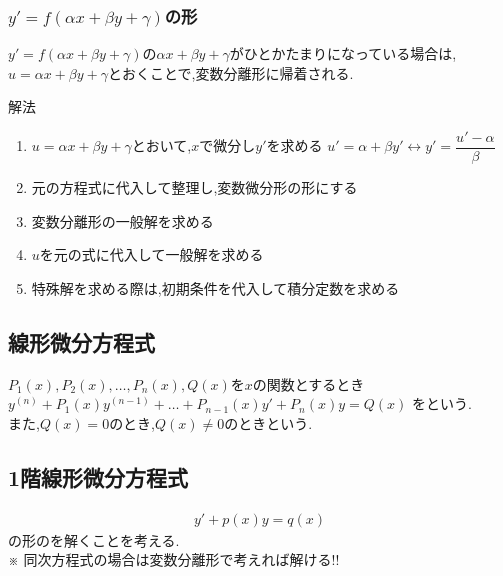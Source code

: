 \documentclass[a4paper]{jsarticle}
\begin{document}
\subsubsection{$y'=f\left(\alpha x+\beta y+\gamma\right)$の形}
$y'=f\left(\alpha x+\beta y+\gamma\right)$の$\alpha x+\beta y+\gamma$がひとかたまりになっている場合は,
$u=\alpha x+\beta y+\gamma$とおくことで,変数分離形に帰着される.
\begin{itembox}[l]{解法}
    \begin{enumerate}[(1)]
        \item $u=\alpha x+\beta y+\gamma$とおいて,$x$で微分し$y'$を求める
              \quad$u'=\alpha+\beta y'\leftrightarrow y'=\dfrac{u'-\alpha}{\beta}$
        \item 元の方程式に代入して整理し,変数微分形の形にする
        \item 変数分離形の一般解を求める
        \item $u$を元の式に代入して一般解を求める
        \item 特殊解を求める際は,初期条件を代入して積分定数を求める
    \end{enumerate}
\end{itembox}
\subsection{線形微分方程式}
$P_1\left(x\right),P_2\left(x\right),\dots,P_n\left(x\right),Q\left(x\right)$を$x$の関数とするとき\\
$y^{\left(n\right)}+P_1\left(x\right)y^{\left(n-1\right)}+\dots+P_{n-1}\left(x\right)y'+P_n\left(x\right)y=Q\left(x\right)$
をという.\\
また,$Q\left(x\right)=0$のとき,$Q\left(x\right)\neq0$のときという.
\subsection{1階線形微分方程式}
\begin{eqnarray*}
    y'+p\left(x\right)y=q\left(x\right)
\end{eqnarray*}
の形のを解くことを考える.\\
※ 同次方程式の場合は変数分離形で考えれば解ける!!\\
\end{document}
